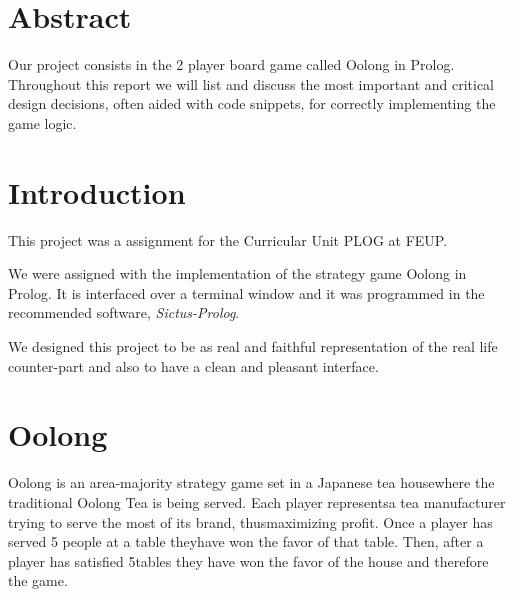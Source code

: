 \documentclass[a4paper]{article}
\begin{document}
\newpage

    \section{Abstract}
    \normalsize

Our project consists in the 2 player board game called Oolong in Prolog.
 Throughout this report we will list and discuss the most important and
 critical design decisions, often aided with code snippets, for correctly
 implementing the game logic.
\newpage



\tableofcontents



\newpage

\section{Introduction}

This project was a assignment for the Curricular Unit PLOG at FEUP. \par
We were assigned with the implementation of the strategy game Oolong in Prolog.
It is interfaced over a terminal window and it was programmed in the recommended software,
 \textit{Sictus-Prolog}.
 \par
We designed this project to be as real and faithful representation of the real life counter-part and
also to have a clean and pleasant interface.



\section{Oolong}
Oolong​ ​is​ ​an​ ​area-majority​ ​strategy​ ​game​ ​set​ ​in​ ​a​ ​Japanese​ ​tea​ ​house​ ​where​ ​the​ ​traditional
Oolong​ ​Tea​​ ​is​ ​being​ ​served.​ ​Each​ ​player​ ​represents​ ​a​ ​tea​ ​manufacturer​ ​trying​ ​to​ ​serve​ ​the​ ​most
of​ ​its​ ​brand,​ ​thus​ ​maximizing​ ​profit.​ ​Once​ ​a​ ​player​ ​has​ ​served​ ​5​ ​people​ ​at​ ​a​ ​table​ ​they​ ​have​ ​won
the​ ​favor​ ​of​ ​that​ ​table.​ ​Then,​ ​after​ ​a​ ​player​ ​has​ ​satisfied​ ​5​ ​tables​ ​they​ ​have​ ​won​ ​the​ ​favor​ ​of​ ​the
house​ ​and​ ​therefore​ ​the​ ​game.
\end{document}
